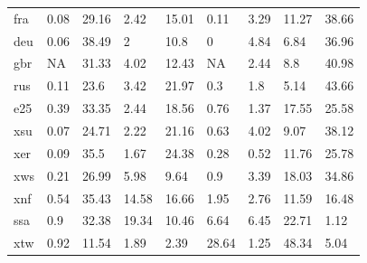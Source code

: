\begin{table}[htb]
\begin{tabularx}{0.7\textwidth}{lllllllll}
fra & 0.08 & 29.16 & 2.42 & 15.01 & 0.11 & 3.29 & 11.27 & 38.66 \\
deu & 0.06 & 38.49 & 2 & 10.8 & 0 & 4.84 & 6.84 & 36.96 \\
gbr & NA & 31.33 & 4.02 & 12.43 & NA & 2.44 & 8.8 & 40.98 \\
rus & 0.11 & 23.6 & 3.42 & 21.97 & 0.3 & 1.8 & 5.14 & 43.66 \\
e25 & 0.39 & 33.35 & 2.44 & 18.56 & 0.76 & 1.37 & 17.55 & 25.58 \\
xsu & 0.07 & 24.71 & 2.22 & 21.16 & 0.63 & 4.02 & 9.07 & 38.12 \\
xer & 0.09 & 35.5 & 1.67 & 24.38 & 0.28 & 0.52 & 11.76 & 25.78 \\
xws & 0.21 & 26.99 & 5.98 & 9.64 & 0.9 & 3.39 & 18.03 & 34.86 \\
xnf & 0.54 & 35.43 & 14.58 & 16.66 & 1.95 & 2.76 & 11.59 & 16.48 \\
ssa & 0.9 & 32.38 & 19.34 & 10.46 & 6.64 & 6.45 & 22.71 & 1.12 \\
xtw & 0.92 & 11.54 & 1.89 & 2.39 & 28.64 & 1.25 & 48.34 & 5.04 \\
\bottomrule
\end{tabularx}
\end{table}

